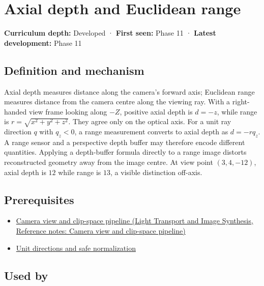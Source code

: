 \hypertarget{appendix-cac01ebeeb11}{}\label{referencestart:appendix-cac01ebeeb11}
\section{Axial depth and Euclidean range}\label{appendix-cac01ebeeb11-axial-depth-and-euclidean-range}

\textbf{Curriculum depth:} Developed · \textbf{First seen:} Phase 11 · \textbf{Latest development:} Phase 11

\subsection{Definition and mechanism}\label{appendix-cac01ebeeb11-definition-and-mechanism}

Axial depth measures distance along the camera's forward axis; Euclidean range measures distance from the camera centre along the viewing ray. With a right-handed view frame looking along \(-Z\), positive axial depth is \(d=-z\), while range is \(r=\sqrt{x^2+y^2+z^2}\). They agree only on the optical axis. For a unit ray direction \(q\) with \(q_z<0\), a range measurement converts to axial depth as \(d=-rq_z\). A range sensor and a perspective depth buffer may therefore encode different quantities. Applying a depth-buffer formula directly to a range image distorts reconstructed geometry away from the image centre. At view point \((3,4,-12)\), axial depth is \(12\) while range is \(13\), a visible distinction off-axis.

\subsection{Prerequisites}\label{appendix-cac01ebeeb11-prerequisites}

\begin{itemize}
\tightlist
\item
  \href{../04-Light-Transport-and-Image-Synthesis/main.pdf\#nameddest=appendix-1c07d64f5e70}{Camera view and clip-space pipeline (Light Transport and Image Synthesis, Reference notes: Camera view and clip-space pipeline)}
\item
  \hyperref[appendix-f744e41b95b4]{Unit directions and safe normalization}
\end{itemize}

\subsection{Used by}\label{appendix-cac01ebeeb11-used-by}

